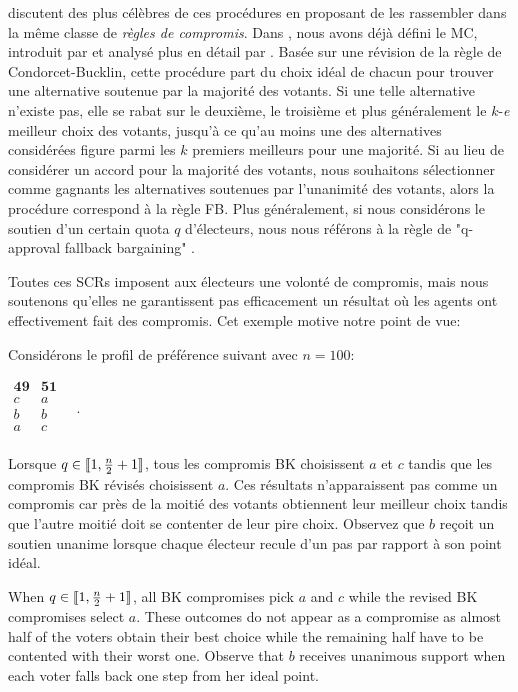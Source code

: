 	\cite{Merlin2019} discutent des plus célèbres de ces procédures en proposant de les rassembler dans la même classe de \textit{règles de compromis}.
	Dans , nous avons déjà défini le \acl{MC}, introduit par \citet{Sertel1986} et analysé plus en détail par \citet{Sertel1999}. Basée sur une révision de la règle de Condorcet-Bucklin, cette procédure part du choix idéal de chacun pour trouver une alternative soutenue par la majorité des votants. Si une telle alternative n'existe pas, elle se rabat sur le deuxième, le troisième et plus généralement le $k$-\emph{e} meilleur choix des votants, jusqu'à ce qu'au moins une des alternatives considérées figure parmi les $k$ premiers meilleurs pour une majorité.
	Si au lieu de considérer un accord pour la majorité des votants, nous souhaitons sélectionner comme gagnants les alternatives soutenues par l'unanimité des votants, alors la procédure correspond à la règle \acl{FB}. 
	Plus généralement, si nous considérons le soutien d'un certain quota $q$ d'électeurs, nous nous référons à la règle de "q-approval fallback bargaining" \citep{Brams2001}.
	
	Toutes ces \acp{SCR} imposent aux électeurs une volonté de compromis, mais nous soutenons qu'elles ne garantissent pas efficacement un résultat où les agents ont effectivement fait des compromis. Cet exemple motive notre point de vue:
	
	\begin{example}
		Considérons le profil de préférence suivant avec $n=100$:
		\begin{center}
			$
			\begin{array}{cc}
				\mathbf{49} & \mathbf{51} \\
				c	&	a	\\
				b	&	b	\\
				a	&	c	\\
			\end{array} \quad.
			$
		\end{center}
		Lorsque $q\in \llbracket1,\frac{n}{2}+1\rrbracket $, tous les compromis BK choisissent $a$ et $c$ tandis que les compromis BK révisés choisissent $a$. Ces résultats n'apparaissent pas comme un compromis car près de la moitié des votants obtiennent leur meilleur choix tandis que l'autre moitié doit se contenter de leur pire choix. Observez que $b$ reçoit un soutien unanime lorsque chaque électeur recule d'un pas par rapport à son point idéal.
	
		When $q\in \llbracket1,\frac{n}{2}+1\rrbracket $, all BK compromises pick $a$ and $c$ while the revised BK compromises select $a$. These outcomes do not appear as a compromise as almost half of the voters obtain their best choice while the remaining half have to be contented with their worst one. Observe that $b$ receives unanimous support when each voter falls back one step from her ideal point.
	\end{example}
	
